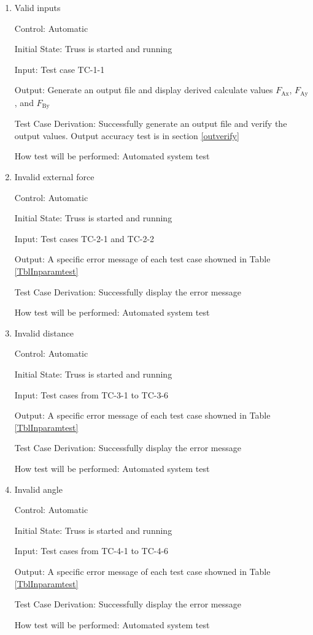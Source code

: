 \documentclass[12pt, titlepage]{article}
\begin{document}
\begin{enumerate}
\item{Valid inputs\\}

Control: Automatic

Initial State: Truss is started and running

Input: Test case TC-1-1

Output: Generate an output file and display derived calculate values 
$F_\text{Ax}$, $F_\text{Ay}$, and $F_\text{By}$

Test Case Derivation: Successfully generate an output file and verify the 
output values. Output accuracy test is in section \ref{outverify}

How test will be performed: Automated system test

\item{Invalid external force\\}

Control: Automatic

Initial State: Truss is started and running

Input: Test cases TC-2-1 and TC-2-2

Output: A specific error message of each test case showned in 
Table \ref{TblInparamtest}

Test Case Derivation: Successfully display the error message

How test will be performed: Automated system test

\item{Invalid distance\\}

Control: Automatic
					
Initial State: Truss is started and running
					
Input: Test cases from TC-3-1 to TC-3-6
					
Output: A specific error message of each test case showned in 
Table \ref{TblInparamtest}

Test Case Derivation: Successfully display the error message

How test will be performed: Automated system test

\item{Invalid angle\\}

Control: Automatic

Initial State: Truss is started and running

Input: Test cases from TC-4-1 to TC-4-6

Output: A specific error message of each test case showned in 
Table \ref{TblInparamtest}

Test Case Derivation: Successfully display the error message

How test will be performed: Automated system test

\end{enumerate}
\end{document}
